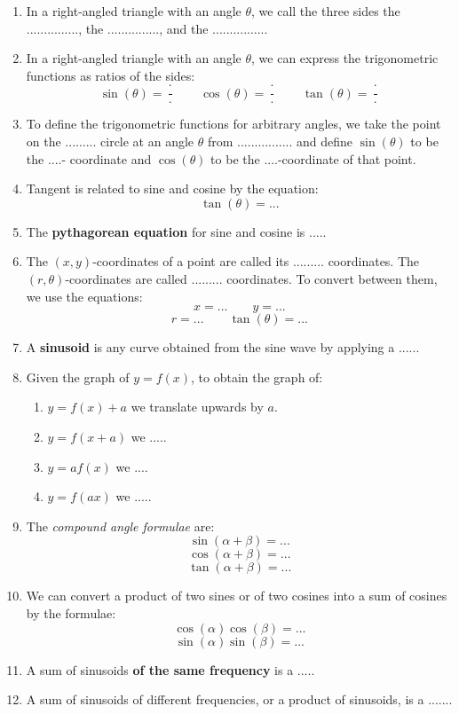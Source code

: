 \documentclass{article}
\begin{document}
\begin{enumerate}
\item In a right-angled triangle with an angle $\theta$, we call the three sides the ..............., the ..............., and the ................
\item In a right-angled triangle with an angle $\theta$, we can express the trigonometric functions as ratios of the sides:
	\[\sin(\theta)=\frac{\cdot}{\cdot}\qquad \cos(\theta)=\frac{\cdot}{\cdot}\qquad \tan(\theta)=\frac{\cdot}{\cdot}\]
\item To define the trigonometric functions for arbitrary angles, we take the point on the ......... circle at an angle $\theta$ from ................ and define $\sin(\theta)$ to be the ....-	coordinate and $\cos(\theta)$ to be the ....-coordinate of that point.
\item Tangent is related to sine and cosine by the equation:
	\[\tan(\theta) = ...\]
\item The \textbf{pythagorean equation} for sine and cosine is .....
\item The $(x,y)$-coordinates of a point are called its ......... coordinates. The $(r,\theta)$-coordinates are called ......... coordinates. To convert between them, we use the equations:
	\[x=...\qquad y=...\]
	\[r=...\qquad \tan(\theta)=...\]
\item A \textbf{sinusoid} is any curve obtained from the sine wave by applying a ......
\item Given the graph of $y=f(x)$, to obtain the graph of:
	\begin{enumerate}
		\item $y=f(x)+a$ we translate upwards by $a$.
		\item $y=f(x+a)$ we .....
		\item $y=af(x)$ we ....
		\item $y=f(ax)$ we .....
	\end{enumerate}
\item The \textit{compound angle formulae} are:
	\[\sin(\alpha+\beta)=...\]
	\[\cos(\alpha+\beta)=...\]
	\[\tan(\alpha+\beta)=...\]
\item We can convert a product of two sines or of two cosines into a sum of cosines by the formulae:
	\[\cos(\alpha)\cos(\beta)=...\]
	\[\sin(\alpha)\sin(\beta)=...\]
\item A sum of sinusoids \textbf{of the same frequency} is a .....
\item A sum of sinusoids of different frequencies, or a product of sinusoids, is a .......
\end{enumerate}
\end{document}
